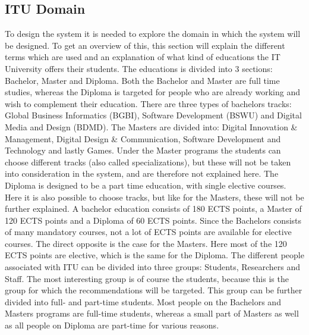 \newpage
\subsection{ITU Domain}
To design the system it is needed to explore the domain in which the system will be designed. To get an overview of this, this section will explain the different terms which are used and an explanation of what kind of educations the IT University offers their students.\newline
The educations is divided into 3 sections: Bachelor, Master and Diploma. Both the Bachelor and Master are full time studies, whereas the Diploma is targeted for people who are already working and wish to complement their education. There are three types of bachelors tracks: Global Business Informatics (BGBI), Software Development (BSWU) and Digital Media and Design (BDMD). The Masters are divided into: Digital Innovation \& Management, Digital Design \& Communication, Software Development and Technology and lastly Games. Under the Master programs the students can choose different tracks (also called specializations), but these will not be taken into consideration in the system, and are therefore not explained here. The Diploma is designed to be a part time education, with single elective courses. Here it is also possible to choose tracks, but like for the Masters, these will not be further explained. 
A bachelor education consists of 180 ECTS points, a Master of 120 ECTS points and a Diploma of 60 ECTS points. Since the Bachelors consists of many mandatory courses, not a lot of ECTS points are available for elective courses. The direct opposite is the case for the Masters. Here most of the 120 ECTS points are elective, which is the same for the Diploma. \newline
The different people associated with ITU can be divided into three groups: Students, Researchers and Staff. The most interesting group is of course the students, because this is the group for which the recommendations will be targeted. This group can be further divided into full- and part-time students. Most people on the Bachelors and Masters programs are full-time students, whereas a small part of Masters as well as all people on Diploma are part-time for various reasons. 
\newpage